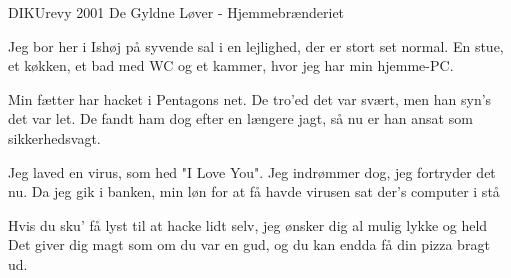 {DIKUrevy 2001}
{De Gyldne Løver - Hjemmebrænderiet}
{
Jeg bor her i Ishøj på syvende sal
i en lejlighed, der er stort set normal.
En stue, et køkken, et bad med WC
og et kammer, hvor jeg har min hjemme-PC.


Min fætter har hacket i Pentagons net.
De tro'ed det var svært, men han syn's det var let.
De fandt ham dog efter en længere jagt,
så nu er han ansat som sikkerhedsvagt.



Jeg laved en virus, som hed "I Love You".
Jeg indrømmer dog, jeg fortryder det nu.
Da jeg gik i banken, min løn for at få
havde virusen sat der's computer i stå


Hvis du sku' få lyst til at hacke lidt selv,
jeg ønsker dig al mulig lykke og held
Det giver dig magt som om du var en gud,
og du kan endda få din pizza bragt ud.

}

